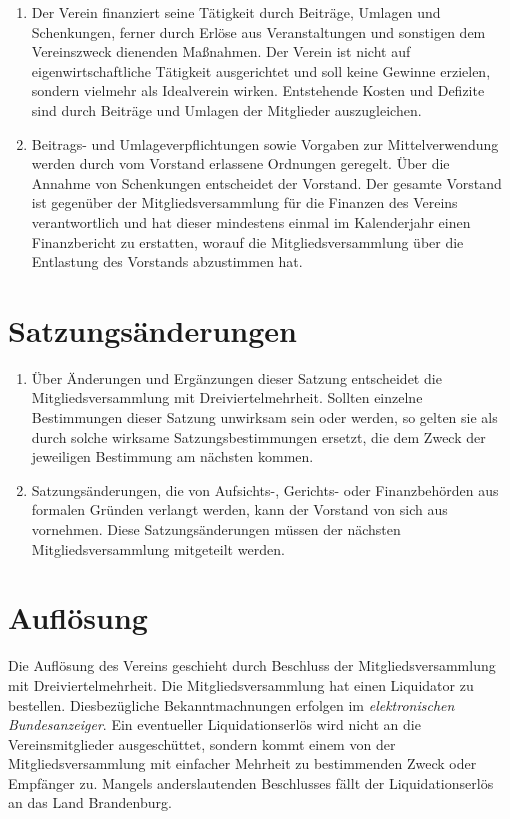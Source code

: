 \documentclass[a4paper, 10pt, headings=normal]{scrartcl}
\begin{document}
\begin{multicols}{2}
\begin{enumerate}[label={(\arabic*)}]
	\item
		Der Verein finanziert seine Tätigkeit durch Beiträge, Umlagen und Schenkungen, ferner durch Erlöse aus Veranstaltungen und sonstigen dem Vereinszweck dienenden Maßnahmen.
		Der Verein ist nicht auf eigenwirtschaftliche Tätigkeit ausgerichtet und soll keine Gewinne erzielen, sondern vielmehr als Idealverein wirken.
		Entstehende Kosten und Defizite sind durch Beiträge und Umlagen der Mitglieder auszugleichen.
	\item
		Beitrags- und Umlageverpflichtungen sowie Vorgaben zur Mittelverwendung werden durch vom Vorstand erlassene Ordnungen geregelt.
		Über die Annahme von Schenkungen entscheidet der Vorstand.
		Der gesamte Vorstand ist gegenüber der Mitgliedsversammlung für die Finanzen des Vereins verantwortlich und hat dieser mindestens einmal im Kalenderjahr einen Finanzbericht zu erstatten, worauf die Mitgliedsversammlung über die Entlastung des Vorstands abzustimmen hat.
\end{enumerate}

\section{Satzungsänderungen}
\label{par:satzungsaenderungen}

\begin{enumerate}[label={(\arabic*)}]
	\item
		Über Änderungen und Ergänzungen dieser Satzung entscheidet die Mitgliedsversammlung mit Dreiviertelmehrheit.
		Sollten einzelne Bestimmungen dieser Satzung unwirksam sein oder werden, so gelten sie als durch solche wirksame Satzungsbestimmungen ersetzt, die dem Zweck der jeweiligen Bestimmung am nächsten kommen.
	\item
		Satzungsänderungen, die von Aufsichts\mbox{-,} Gerichts- oder Finanzbehörden aus formalen Gründen verlangt werden, kann der Vorstand von sich aus vornehmen.
		Diese Satzungsänderungen müssen der nächsten Mitgliedsversammlung mitgeteilt werden.
\end{enumerate}

\section{Auflösung}
\label{par:aufloseung}

Die Auflösung des Vereins geschieht durch Beschluss der Mitgliedsversammlung mit Dreiviertelmehrheit.
Die Mitgliedsversammlung hat einen Liquidator zu bestellen.
Diesbezügliche Bekanntmachnungen erfolgen im \emph{elektronischen Bundesanzeiger}.
Ein eventueller Liquidationserlös wird nicht an die Vereinsmitglieder ausgeschüttet, sondern kommt einem von der Mitgliedsversammlung mit einfacher Mehrheit zu bestimmenden Zweck oder Empfänger zu.
Mangels anderslautenden Beschlusses fällt der Liquidationserlös an das Land Brandenburg.


\end{multicols}
\end{document}
